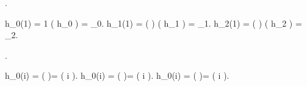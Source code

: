 \documentclass[12pt]{book}
\begin{document}
{{{{{				.

				h_0(1) = 1 \imp \im( h_0 ) = \Omega_0.
				h_1(1) = \exp(  ) \imp \im( h_1 ) = \Omega_1.
				h_2(1) = \exp(  ) \imp \im( h_2 ) = \Omega_2.
			}.

			\particular
			{
				h_0(i) = \exp(  )= \exp(  i ).
				h_0(i) = \exp(  )= \exp(  i ).
				h_0(i) = \exp(  )= \exp(  i ).
			}
		}
	}
	
	\baselineskip=30pt
	


	
	
	

		
}}
\end{document}
